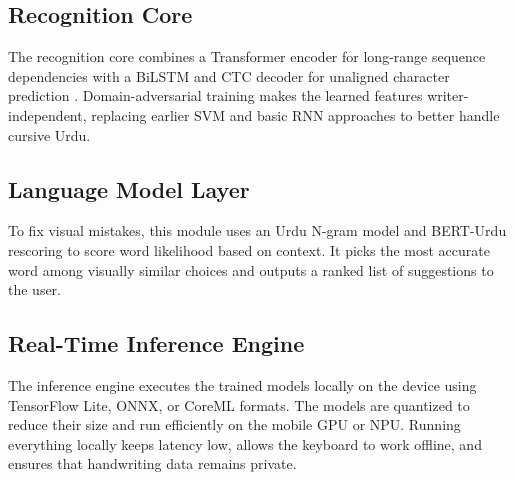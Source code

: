 \documentclass[12pt,a4paper]{report}
\begin{document}
\subsection{Recognition Core}
The recognition core combines a Transformer encoder for long-range sequence dependencies with a BiLSTM and CTC decoder for unaligned character prediction \cite{graves2006, graves2008}. Domain-adversarial training \cite{ganin2016} makes the learned features writer-independent, replacing earlier SVM and basic RNN approaches to better handle cursive Urdu.

\subsection{Language Model Layer}
To fix visual mistakes, this module uses an Urdu N-gram model and BERT-Urdu rescoring \cite{devlin2019} to score word likelihood based on context. It picks the most accurate word among visually similar choices and outputs a ranked list of suggestions to the user.

\subsection{Real-Time Inference Engine}
The inference engine executes the trained models locally on the device using TensorFlow Lite, ONNX, or CoreML formats. The models are quantized to reduce their size and run efficiently on the mobile GPU or NPU. Running everything locally keeps latency low, allows the keyboard to work offline, and ensures that handwriting data remains private.
\end{document}
